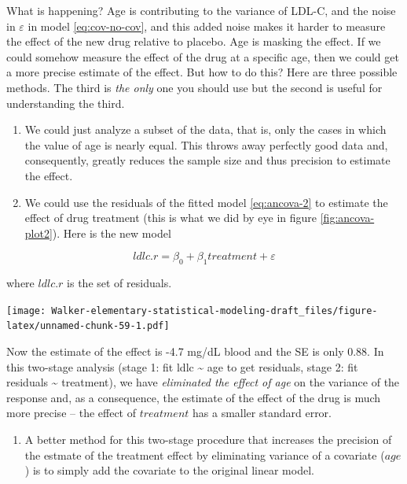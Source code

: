 \documentclass[]{book}
\providecommand{\tightlist}{%
  \setlength{\itemsep}{0pt}\setlength{\parskip}{0pt}}
\begin{document}
What is happening? Age is contributing to the variance of LDL-C, and the
noise in \(\varepsilon\) in model \eqref{eq:cov-no-cov}, and this added
noise makes it harder to measure the effect of the new drug relative to
placebo. Age is masking the effect. If we could somehow measure the
effect of the drug at a specific age, then we could get a more precise
estimate of the effect. But how to do this? Here are three possible
methods. The third is \emph{the only} one you should use but the second
is useful for understanding the third.

\begin{enumerate}
\def\labelenumi{\arabic{enumi}.}
\item
  We could just analyze a subset of the data, that is, only the cases in
  which the value of age is nearly equal. This throws away perfectly
  good data and, consequently, greatly reduces the sample size and thus
  precision to estimate the effect.
\item
  We could use the residuals of the fitted model \eqref{eq:ancova-2} to
  estimate the effect of drug treatment (this is what we did by eye in
  figure \ref{fig:ancova-plot2}). Here is the new model
\end{enumerate}

\begin{equation}
ldlc.r = \beta_0 + \beta_1 treatment + \varepsilon
\label{eq:ancova-3}
\end{equation}

where \(ldlc.r\) is the set of residuals.

\texttt{[image: Walker-elementary-statistical-modeling-draft\_files/figure-latex/unnamed-chunk-59-1.pdf]}

Now the estimate of the effect is -4.7 mg/dL blood and the SE is only
0.88. In this two-stage analysis (stage 1: fit ldlc \textasciitilde{}
age to get residuals, stage 2: fit residuals \textasciitilde{}
treatment), we have \emph{eliminated the effect of age} on the variance
of the response and, as a consequence, the estimate of the effect of the
drug is much more precise -- the effect of \(treatment\) has a smaller
standard error.

\begin{enumerate}
\def\labelenumi{\arabic{enumi}.}
\setcounter{enumi}{2}
\tightlist
\item
  A better method for this two-stage procedure that increases the
  precision of the estmate of the treatment effect by eliminating
  variance of a covariate (\(age\)) is to simply add the covariate to
  the original linear model.
\end{enumerate}
\end{document}
